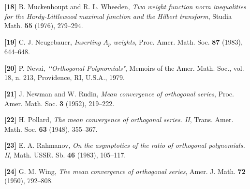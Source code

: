 \item {{\bf [18]}} B. Muckenhoupt and R. L. Wheeden, {\it Two weight function
norm inequalities for the Hardy-Littlewood maximal function and the Hilbert
transform}, Studia Math. {\bf 55} (1976), 279--294.

\item {{\bf [19]}} C. J. Neugebauer, {\it Inserting $A_p$ weights}, Proc. Amer.
Math. Soc. {\bf 87} (1983), 644--648.

\item {\bf [20]} {\rm P. Nevai, {\it \lq \lq Orthogonal Polynomials"}, Memoirs
of the Amer. Math. Soc., vol. 18, n. 213, Providence, RI, U.S.A., 1979.}

\item {{\bf [21]}} J. Newman and W. Rudin, {\it Mean convergence of orthogonal
series}, Proc. Amer. Math. Soc. {\bf 3} (1952), 219--222.

\item {{\bf [22]}} H. Pollard, {\it The mean convergence of orthogonal series.
II}, Trans. Amer. Math. Soc. {\bf 63} (1948), 355--367.

\item {{\bf [23]}} E. A. Rahmanov, {\it On the asymptotics of the ratio of
orthogonal polynomials. II}, Math. USSR. Sb. {\bf 46} (1983), 105--117.

\item {{\bf [24]}} G. M. Wing, {\it The mean convergence of orthogonal series},
Amer. J. Math. {\bf 72} (1950), 792--808.

\bye
